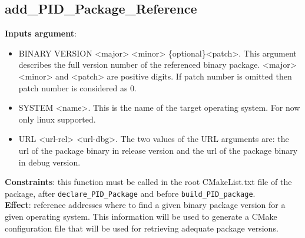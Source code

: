 \documentclass[12pt,a4paper]{article}
\begin{document}
\subsection{add\_PID\_Package\_Reference}
\textbf{Inputs argument}:
\begin{itemize}
\item BINARY VERSION <major> <minor> \{optional\}<patch>. This argument describes the full version number of the referenced binary package. <major> <minor> and <patch> are positive digits. If patch number is omitted then patch number is considered as 0.
\item SYSTEM <name>. This is the name of the target operating system. For now only linux supported.
\item URL <url-rel> <url-dbg>. The two values of the URL arguments are: the url of the package binary in release version and the url of the package binary in debug version.
\end{itemize}
\textbf{Constraints}: this function must be called in the root CMakeList.txt file of the package, after \texttt{declare\_PID\_Package} and before \texttt{build\_PID\_package}.\\
\textbf{Effect}: reference addresses where to find a given binary package version for a given operating system. This information will be used to generate a CMake configuration file that will be used for retrieving adequate package versions.
\end{document}
